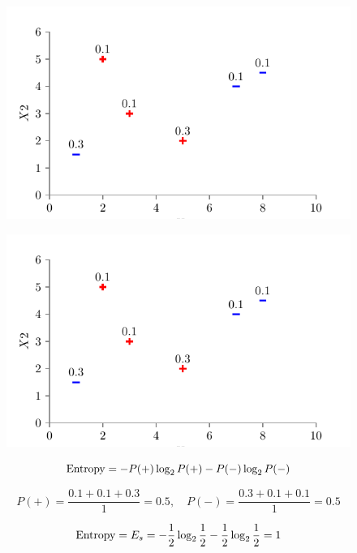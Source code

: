 \documentclass[usenames,dvipsnames]{beamer}
\begin{document}
	\begin{frame}
	
	\begin{figure}
		\centering
		\includegraphics{../assets/decision-trees/figures/dt_weighted/fig2.pdf}
	\end{figure}

	\end{frame}

	\begin{frame}
	
	\begin{figure}
		\centering
		\includegraphics{../assets/decision-trees/figures/dt_weighted/fig2.pdf}
	\end{figure}
	
	$$\operatorname{Entropy} = -P(+) \log_2 P(+) - P(-) \log_2 P(-)$$
	
	$$P(+) = \frac{0.1 + 0.1 + 0.3}{1} = 0.5, \quad P(-) = \frac{0.3 + 0.1 + 0.1}{1} = 0.5$$
	
	$$\operatorname{Entropy} = E_s = -\frac{1}{2} \log_2 \frac{1}{2} - \frac{1}{2} \log_2 \frac{1}{2} = 1$$
	
	\end{frame}
\end{document}
